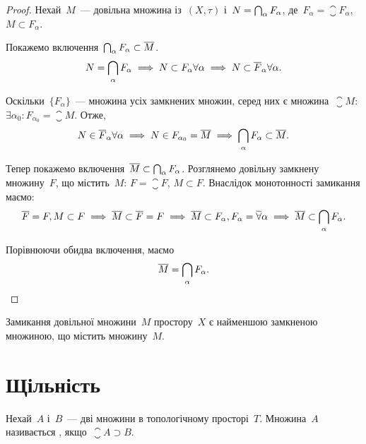 \begin{proof}
    Нехай~$M$~--- довільна множина із~$(X, \tau)$ і~$N = \operatorname*{\bigcap}_\alpha F_\alpha$, де~$F_\alpha = \closure F_\alpha$, $M \subset F_\alpha$.

    Покажемо включення~$\operatorname*{\bigcap}_\alpha F_\alpha \subset \overline{M}$.
    \begin{equation*}
        N = \operatorname*{\bigcap}_\alpha F_\alpha \implies N \subset F_\alpha \forall \alpha \implies N \subset \overline{F}_\alpha \forall \alpha.
    \end{equation*}
    
    Оскільки~$\{F_\alpha\}$~--- множина усіх замкнених множин, серед них є множина~$\closure M$: $\exists \alpha_0: F_{\alpha_0} = \closure M$. Отже,
    \begin{equation*}
        N \in \overline{F}_\alpha \forall \alpha \implies N \in F_{\alpha_0} = \overline{M} \implies \operatorname*{\bigcap}_\alpha F_\alpha \subset \overline{M}.
    \end{equation*}
    
    Тепер покажемо включення~$\overline{M} \subset \operatorname*{\bigcap}_\alpha F_\alpha$. Розглянемо довільну замкнену множину~$F$, що містить~$M$: $F = \closure F$, $M \subset F$. Внаслідок монотонності замикання маємо:
    \begin{equation*}
        \overline{F} = F, M \subset F \implies
        \overline{M} \subset \overline{F} = F \implies
        \overline{M} \subset F_\alpha, F_\alpha = \overline{\forall} \alpha \implies
        \overline{M} \subset \operatorname*{\bigcap}_\alpha F_\alpha.
    \end{equation*}
    
    Порівнюючи обидва включення, маємо
    \begin{equation*}
        \overline{M} = \operatorname*{\bigcap}_\alpha F_\alpha. \qedhere
    \end{equation*}
\end{proof}

\begin{corollary}
    Замикання довільної множини~$M$ простору~$X$ є найменшою замкненою множиною, що містить множину~$M$.
\end{corollary}

\section{Щільність}

\begin{definition}
    Нехай~$A$ і~$B$~--- дві множини в топологічному просторі~$T$. Множина~$A$ називається , якщо~$\closure A \supset B$.
\end{definition}

